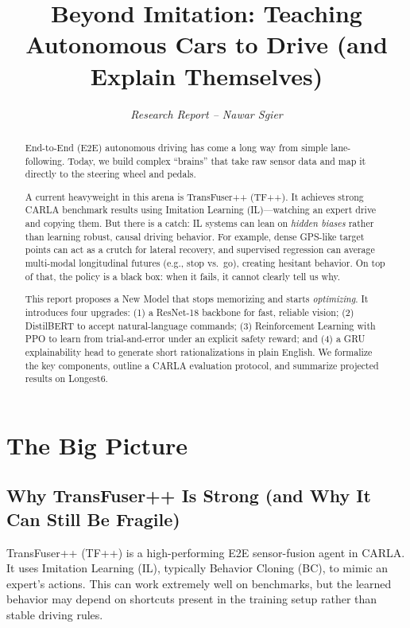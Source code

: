 \documentclass[11pt]{article}
\title{\textbf{Beyond Imitation: Teaching Autonomous Cars to Drive (and Explain Themselves)}}
\author{\textit{Research Report -- Nawar Sgier}}
\date{}
\begin{document}
\maketitle

\begin{abstract}
End-to-End (E2E) autonomous driving has come a long way from simple lane-following. Today, we build complex ``brains'' that take raw sensor data and map it directly to the steering wheel and pedals.

A current heavyweight in this arena is TransFuser++ (TF++). It achieves strong CARLA benchmark results using Imitation Learning (IL)---watching an expert drive and copying them. But there is a catch: IL systems can lean on \emph{hidden biases} rather than learning robust, causal driving behavior. For example, dense GPS-like target points can act as a crutch for lateral recovery, and supervised regression can average multi-modal longitudinal futures (e.g., stop vs.\ go), creating hesitant behavior. On top of that, the policy is a black box: when it fails, it cannot clearly tell us why.

This report proposes a New Model that stops memorizing and starts \emph{optimizing}. It introduces four upgrades: (1) a ResNet-18 backbone for fast, reliable vision; (2) DistilBERT to accept natural-language commands; (3) Reinforcement Learning with PPO to learn from trial-and-error under an explicit safety reward; and (4) a GRU explainability head to generate short rationalizations in plain English. We formalize the key components, outline a CARLA evaluation protocol, and summarize projected results on Longest6.
\end{abstract}

\section{The Big Picture}

\subsection{Why TransFuser++ Is Strong (and Why It Can Still Be Fragile)}
TransFuser++ (TF++) is a high-performing E2E sensor-fusion agent in CARLA. It uses Imitation Learning (IL), typically Behavior Cloning (BC), to mimic an expert's actions. This can work extremely well on benchmarks, but the learned behavior may depend on shortcuts present in the training setup rather than stable driving rules.
\end{document}
